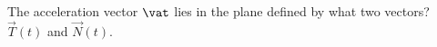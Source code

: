{The acceleration vector $\vat$ lies in the plane defined by what two vectors?
}
{$\vec T(t)$ and $\vec N(t)$.
}